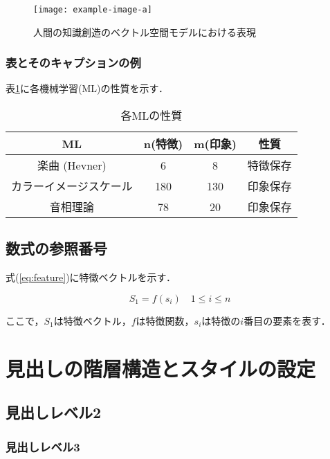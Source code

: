 \documentclass[titlepage,12pt]{ltjsarticle}
\begin{document}
\begin{figure}[htbp]
    \centering
    \texttt{[image: example-image-a]}
    \caption{人間の知識創造のベクトル空間モデルにおける表現}
    \label{fig:vector_space}
\end{figure}

\subsubsection{表とそのキャプションの例}\label{subsubsec:table}
表\ref{tab:ml_properties}に各機械学習(ML)の性質を示す．

\begin{table}[htbp]
    \caption{各MLの性質}
    \centering
    \begin{tabular}{|c|c|c|c|}
        \hline
        ML & n(特徴) & m(印象) & 性質 \\ \hline
        楽曲 (Hevner) & 6 & 8 & 特徴保存 \\ \hline
        カラーイメージスケール & 180 & 130 & 印象保存 \\ \hline
        音相理論 & 78 & 20 & 印象保存 \\ \hline
    \end{tabular}
    \label{tab:ml_properties}
\end{table}

\subsection{数式の参照番号}
式(\ref{eq:feature})に特徴ベクトルを示す．

\begin{equation}\label{eq:feature}
    S_1 = f(s_i) \quad 1 \leq i \leq n
\end{equation}

ここで，$S_1$は特徴ベクトル，$f$は特徴関数，$s_i$は特徴の$i$番目の要素を表す．

\section{見出しの階層構造とスタイルの設定}\label{sec:hierarchy_style}
\subsection{見出しレベル2}\label{subsec:level2}
\subsubsection{見出しレベル3}\label{subsubsec:level3}
\end{document}
